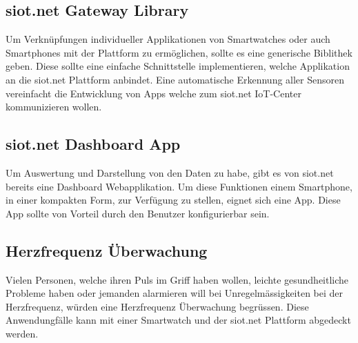 \subsection{siot.net Gateway Library}
Um Verknüpfungen individueller Applikationen von Smartwatches oder auch Smartphones mit der Plattform zu ermöglichen, sollte es eine generische Biblithek geben. Diese sollte eine einfache Schnittstelle implementieren, welche Applikation an die siot.net Plattform anbindet. Eine automatische Erkennung aller Sensoren vereinfacht die Entwicklung von Apps welche zum siot.net IoT-Center kommunizieren wollen.

\subsection{siot.net Dashboard App}
Um Auswertung und Darstellung von den Daten zu habe, gibt es von siot.net bereits eine Dashboard Webapplikation. Um diese Funktionen einem Smartphone, in einer kompakten Form, zur Verfügung zu stellen, eignet sich eine App. Diese App sollte von Vorteil durch den Benutzer konfigurierbar sein.

\subsection{Herzfrequenz Überwachung}
Vielen Personen, welche ihren Puls im Griff haben wollen, leichte gesundheitliche Probleme haben oder jemanden alarmieren will bei Unregelmässigkeiten bei der Herzfrequenz, würden eine Herzfrequenz Überwachung begrüssen. Diese Anwendungfälle kann mit einer Smartwatch und der siot.net Plattform abgedeckt werden.

